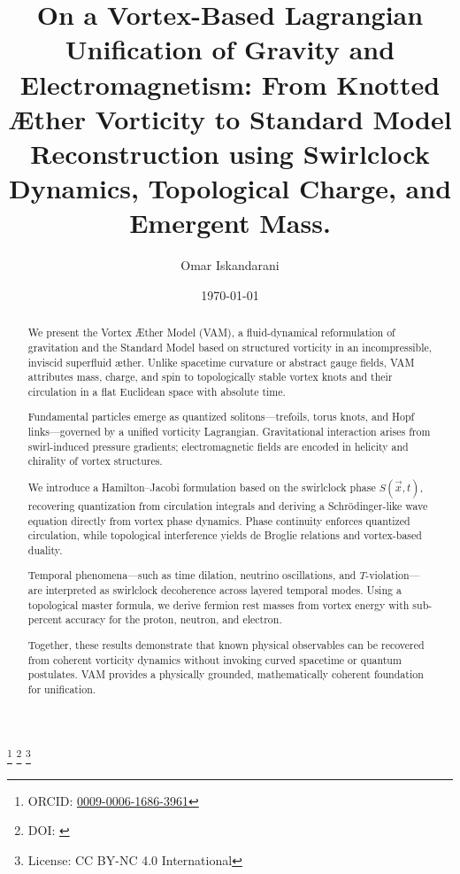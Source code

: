 \documentclass[preprint]{revtex4-2}
\begin{document}
        \begin{abstract}
            We present the Vortex \AE{}ther Model (VAM), a fluid-dynamical reformulation of gravitation and the Standard Model based on structured vorticity in an incompressible, inviscid superfluid æther. Unlike spacetime curvature or abstract gauge fields, VAM attributes mass, charge, and spin to topologically stable vortex knots and their circulation in a flat Euclidean space with absolute time.

            Fundamental particles emerge as quantized solitons—trefoils, torus knots, and Hopf links—governed by a unified vorticity Lagrangian. Gravitational interaction arises from swirl-induced pressure gradients; electromagnetic fields are encoded in helicity and chirality of vortex structures.

            We introduce a Hamilton–Jacobi formulation based on the swirlclock phase \( S(\vec{x}, t) \), recovering quantization from circulation integrals and deriving a Schrödinger-like wave equation directly from vortex phase dynamics. Phase continuity enforces quantized circulation, while topological interference yields de Broglie relations and vortex-based duality.

            Temporal phenomena—such as time dilation, neutrino oscillations, and $T$-violation—are interpreted as swirlclock decoherence across layered temporal modes. Using a topological master formula, we derive fermion rest masses from vortex energy with sub-percent accuracy for the proton, neutron, and electron.

            Together, these results demonstrate that known physical observables can be recovered from coherent vorticity dynamics without invoking curved spacetime or quantum postulates. VAM provides a physically grounded, mathematically coherent foundation for unification.
        \end{abstract}
\title{On a Vortex-Based Lagrangian Unification of Gravity and Electromagnetism:  From Knotted Æther Vorticity to Standard Model Reconstruction using Swirlclock Dynamics, Topological Charge, and Emergent Mass.\\
    \normalsize
}
\author{Omar Iskandarani}
\thanks{ORCID: \href{https://orcid.org/0009-0006-1686-3961}{0009-0006-1686-3961}}
\thanks{DOI: \href{https://doi.org/\paperdoi}{\paperdoi}}
\thanks{License: CC BY-NC 4.0 International}

\date{\today}
\end{document}
